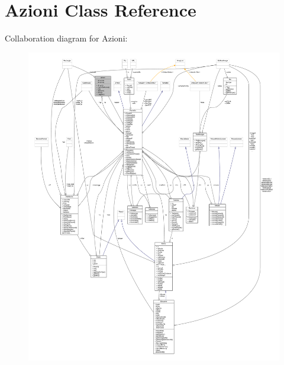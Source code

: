 \hypertarget{classa_1_1survival_1_1game_1_1_azioni}{}\section{Azioni Class Reference}
\label{classa_1_1survival_1_1game_1_1_azioni}


Collaboration diagram for Azioni\+:
\nopagebreak
\begin{figure}[H]
\begin{center}
\leavevmode
\includegraphics[width=350pt]{classa_1_1survival_1_1game_1_1_azioni__coll__graph}
\end{center}
\end{figure}
